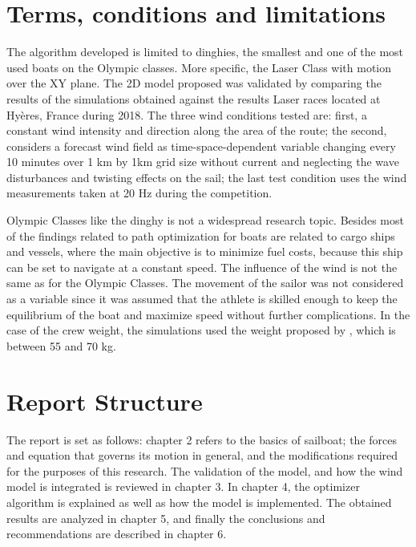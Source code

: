  \section{Terms, conditions and limitations}
The algorithm developed is limited to dinghies, the smallest and one of the most used boats on the Olympic classes. More specific, the Laser Class with motion over the XY plane.  The 2D model proposed was validated by comparing the results of the simulations obtained against the results Laser races located at Hyères, France during 2018. The three wind conditions tested are: first, a constant wind intensity and direction along the area of the route; the second, considers a forecast wind field as time-space-dependent variable changing every 10 minutes over 1 km by 1km grid size without current and neglecting the wave disturbances and twisting effects on the sail; the last test condition uses the wind measurements taken at 20 Hz during the competition. \par 

Olympic Classes like the dinghy is not a widespread research topic. Besides most of the findings related to path optimization for boats are related to cargo ships and vessels, where the main objective is to minimize fuel costs, because this ship can be set to navigate at a constant speed. The influence of the wind is not the same as for the Olympic Classes. The movement of the sailor was not considered as a variable since it was assumed that the athlete is skilled enough to keep the equilibrium of the boat and  maximize speed without further complications. In the case of the crew weight, the simulations used the weight proposed by \cite{laser_opt}, which is between	55 and 70 kg.\par 

 
 \section{Report Structure}
The report is set as follows: chapter 2 refers to the basics of sailboat; the forces and equation that governs its motion in general, and the modifications required for the purposes of this research. The validation of the model, and how the wind model is integrated is reviewed in chapter 3. In chapter 4, the optimizer algorithm is explained as well as how the model is implemented.  The obtained results are analyzed in chapter 5, and finally the conclusions and recommendations are described in chapter 6.\par 

